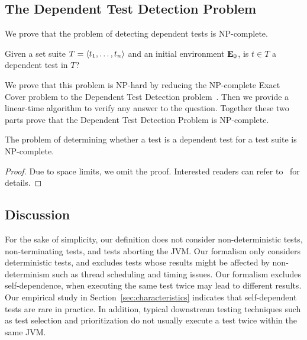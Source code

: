 \subsection{The Dependent Test Detection Problem}

We prove that the problem of detecting dependent tests
 is NP-complete.


\begin{definition}
Given a set suite\/ $T =  \langle t_1, \dots, t_n \rangle $ and an initial environment\/
$\mathbf{E}_0$, is $t \in T$ a dependent test in $T$?
\end{definition}

We prove that this problem is NP-hard by reducing the NP-complete Exact Cover problem
to the Dependent Test Detection
problem~\cite{karp:NP:1972}. 
Then we provide a linear-time algorithm to verify any answer to the
question.
Together these two parts prove that the Dependent Test Detection Problem is NP-complete.

\begin{theorem}
The problem of determining whether a test is a dependent test for
a test suite is NP-complete.
\end{theorem}

\begin{proof}
Due to space limits, we omit the proof. Interested
readers can refer to~\cite{testdependence} for details.
\end{proof}

%

\subsection{Discussion}
\label{sec:formaldiscussion}

For the sake of simplicity, 
our definition does not consider non-deter\-min\-istic
tests, non-terminating tests, and tests aborting the JVM\@.
Our formalism only
considers deterministic tests,
and excludes tests whose results might be affected by
non-determinism such as thread scheduling
and timing issues.
Our formalism excludes self-dependence, 
when executing the same test twice
may lead to different results. Our empirical study
in Section~\ref{sec:characteristics}
indicates that self-dependent tests
are rare in practice. In addition, typical
downstream testing techniques such as test selection and
prioritization do not usually execute a test twice within the same JVM\@.



